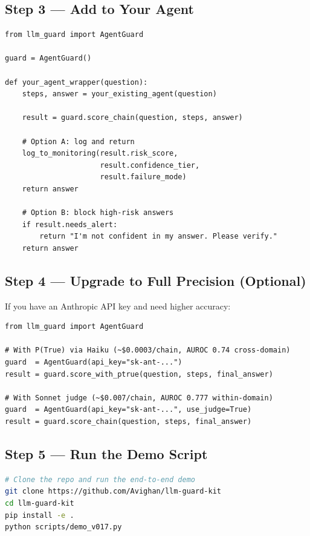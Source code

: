 \documentclass[11pt,a4paper]{article}
\begin{document}
\subsection*{Step 3 --- Add to Your Agent}

\begin{lstlisting}
from llm_guard import AgentGuard

guard = AgentGuard()

def your_agent_wrapper(question):
    steps, answer = your_existing_agent(question)

    result = guard.score_chain(question, steps, answer)

    # Option A: log and return
    log_to_monitoring(result.risk_score,
                      result.confidence_tier,
                      result.failure_mode)
    return answer

    # Option B: block high-risk answers
    if result.needs_alert:
        return "I'm not confident in my answer. Please verify."
    return answer
\end{lstlisting}

\subsection*{Step 4 --- Upgrade to Full Precision (Optional)}

If you have an Anthropic API key and need higher accuracy:

\begin{lstlisting}
from llm_guard import AgentGuard

# With P(True) via Haiku (~$0.0003/chain, AUROC 0.74 cross-domain)
guard  = AgentGuard(api_key="sk-ant-...")
result = guard.score_with_ptrue(question, steps, final_answer)

# With Sonnet judge (~$0.007/chain, AUROC 0.777 within-domain)
guard  = AgentGuard(api_key="sk-ant-...", use_judge=True)
result = guard.score_chain(question, steps, final_answer)
\end{lstlisting}

\subsection*{Step 5 --- Run the Demo Script}

\begin{lstlisting}[language=bash,style=pythonstyle]
# Clone the repo and run the end-to-end demo
git clone https://github.com/Avighan/llm-guard-kit
cd llm-guard-kit
pip install -e .
python scripts/demo_v017.py
\end{lstlisting}
\end{document}
